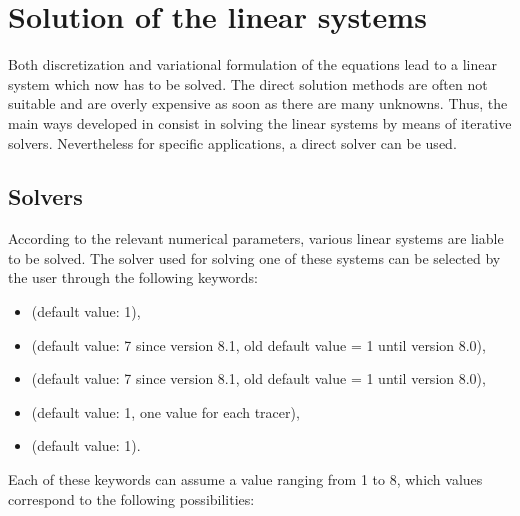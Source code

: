 \section{Solution of the linear systems}

Both discretization and variational formulation of the equations lead to a
linear system which now has to be solved. The direct solution methods are often
not suitable and are overly expensive as soon as there are many unknowns.
Thus, the main ways developed in  consist in solving the linear
systems by means of iterative solvers. Nevertheless for specific applications,
a direct solver can be used.


\subsection{Solvers}
\label{sec:solver}
According to the relevant numerical parameters, various linear systems are
liable to be solved. The solver used for solving one of these systems can be
selected by the user through the following keywords:

\begin{itemize}
\item {} (default value: 1),

\item {} (default value: 7
  since version 8.1, old default value = 1 until version 8.0),

\item {} (default value: 7
  since version 8.1, old default value = 1 until version 8.0),

%
\item {} (default value: 1, one value for
each tracer),

\item {}(default value: 1).
\end{itemize}

Each of these keywords can assume a value ranging from 1 to 8, which values
correspond to the following possibilities:

